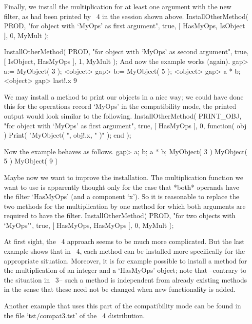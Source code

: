 Finally, we install the multiplication for at least one argument
with the new filter, as had been printed by {\GAP}~4 in the
session shown above.
\begintt
InstallOtherMethod( PROD,
    "for object with `MyOps' as first argument",
    true,
    [ HasMyOps, IsObject ], 0,
    MyMult );

InstallOtherMethod( PROD,
    "for object with `MyOps' as second argument",
    true,
    [ IsObject, HasMyOps ], 1,
    MyMult );
\endtt
And now the example works (again).
\begintt
gap> a:= MyObject( 3 );
<object>
gap> b:= MyObject( 5 );
<object>
gap> a * b;
<object>
gap> last!.x
9
\endtt

We may install a method to print our objects in a nice way;
we could have done this for the operations record `MyOps'
in the compatibility mode,
the printed output would look similar to the following.
\begintt
InstallOtherMethod( PRINT_OBJ,
    "for object with `MyOps' as first argument",
    true,
    [ HasMyOps ], 0,
    function( obj ) Print( "MyObject( ", obj!.x, " )" ); end );
\endtt

Now the example behaves as follows.
\begintt
gap> a;  b;  a * b;
MyObject( 3 )
MyObject( 5 )
MyObject( 9 )
\endtt

Maybe now we want to improve the installation.
The multiplication function we want to use is apparently
thought only for the case that *both* operands have
the filter `HasMyOps' (and a component `x').
So it is reasonable to replace the two methods for
the multiplication by one method for which both arguments
are required to have the filter.
\begintt
InstallOtherMethod( PROD,
    "for two objects with `MyOps'",
    true,
    [ HasMyOps, HasMyOps ], 0,
    MyMult );
\endtt

At first sight, the {\GAP}~4 approach seems to be much more
complicated.
But the last example shows that in {\GAP}~4,
each method can be installed more specifically for the appropriate
situation.
Moreover, it is for example possible to install a method
for the multiplication of an integer and a `HasMyOps' object;
note that --contrary to the situation in {\GAP}~3--
such a method is independent from already existing methods
in the sense that these need not be changed when
new functionality is added.

Another example that uses this part of the compatibility mode can be
found in the file `tst/compat3.tst' of the {\GAP}~4 distribution.

\EndOfBook

